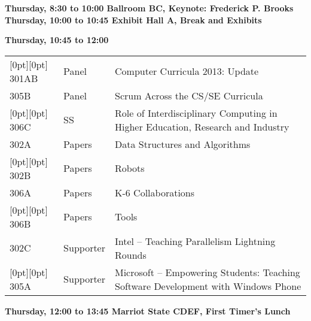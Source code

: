 
\noindent
{\sffamily\bfseries Thursday, 8:30 to 10:00 Ballroom BC, Keynote: Frederick P. Brooks}\newline\noindent
{\sffamily\bfseries Thursday, 10:00 to 10:45 Exhibit Hall A, Break and Exhibits}\newline\noindent

\noindent
{\sffamily\bfseries Thursday, 10:45 to 12:00}\newline\noindent
\begin{tabular*}{5in}{@{}p{0.5in}@{}p{0.75in}@{}p{3.75in}}

\rowcolor[gray]{0.9}[0pt][0pt] 301AB & Panel & Computer Curricula 2013:  Update \\

305B & Panel & Scrum Across the CS/SE Curricula \\

\rowcolor[gray]{0.9}[0pt][0pt] 306C & SS & Role of Interdisciplinary Computing in Higher Education, Research and Industry \\

302A & Papers & Data Structures and Algorithms \\

\rowcolor[gray]{0.9}[0pt][0pt] 302B & Papers & Robots \\

306A & Papers & K-6 Collaborations \\

\rowcolor[gray]{0.9}[0pt][0pt] 306B & Papers & Tools \\

302C & Supporter & Intel  -- Teaching Parallelism Lightning Rounds \\

\rowcolor[gray]{0.9}[0pt][0pt] 305A & Supporter & Microsoft -- Empowering Students: Teaching Software Development with Windows Phone 
\end{tabular*}
{\sffamily\bfseries Thursday, 12:00 to 13:45  Marriot State CDEF, First Timer's Lunch}\newline

